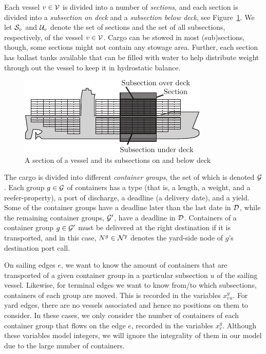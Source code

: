 Each vessel $v\in\mathcal{V}$ is divided into a number of \emph{sections}, and each section is divided into a \emph{subsection on deck} and a \emph{subsection below deck}, see Figure~\ref{fig:vessel}. We let $\mathcal{S}_v$ and $\mathcal{U}_v$ denote the set of sections and the set of all subsections, respectively, of the vessel $v\in \mathcal{V}$.
Cargo can be stowed in most (sub)sections, though, some sections might not contain any stowage area. Further, each section has ballast tanks available that can be filled with water to help distribute weight through out the vessel to keep it in hydrostatic balance.

\begin{figure}
	\centering
		\includegraphics[scale = 1.2]{figures/vessel2.pdf}
		\caption{A section of a vessel and its subsections on and below deck}  \label{fig:vessel}
\end{figure}

The cargo is divided into different \emph{container groups}, the set of which is denoted $\mathcal{G}$. Each group $g\in \mathcal{G}$ of containers has a type (that is, a length, a weight, and a reefer-property), a port of discharge, a deadline (a delivery date), and a yield. Some of the container groups have a deadline later than the last date in $\mathcal{D}$, while the remaining container groups, $\mathcal{G}'$, have a deadline in $\mathcal{D}$. Containers of a container group $g\in\mathcal{G}'$ must be delivered at the right destination if it is transported, and in this case, $N^g \in \mathcal{N}^\texttt{y}$ denotes the yard-side node of $g$'s destination port call.  

On sailing edges $e$, we want to know the amount of containers that are transported of a given container group in a particular subsection $u$ of the sailing vessel. Likewise, for terminal edges we want to know from/to which subsections, containers of each group are moved. This is recorded in the variables $x^g_{eu}$. For yard edges, there are no vessels associated and hence no positions on them to consider. In these cases, we only consider the number of containers of each container group that flows on the edge $e$, recorded in the variables $x^g_e$. Although these variables model integers,  we will ignore the integrality of them in our model due to the large number of containers.

